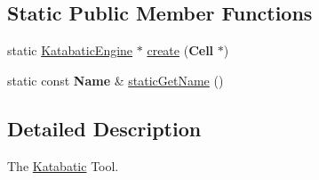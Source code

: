 \subsection*{Static Public Member Functions}
\begin{DoxyCompactItemize}
\item 
static \hyperlink{classKatabatic_1_1KatabaticEngine}{Katabatic\-Engine} $\ast$ \hyperlink{classKatabatic_1_1KatabaticEngine_ab877a64c314024602cfb04631ebfbfc4}{create} ({\bf Cell} $\ast$)
\item 
static const {\bf Name} \& \hyperlink{classKatabatic_1_1KatabaticEngine_a802eee6265da8d536db52d412f8a4afd}{static\-Get\-Name} ()
\end{DoxyCompactItemize}


\subsection{Detailed Description}
The \hyperlink{namespaceKatabatic}{Katabatic} Tool. 

